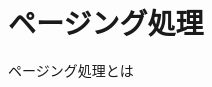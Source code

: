 \documentclass[../../../main]{subfiles}
\begin{document}
    \section{ページング処理}\label{sec:phraseology-paging_pagination}

    ページング処理とは
\end{document}
